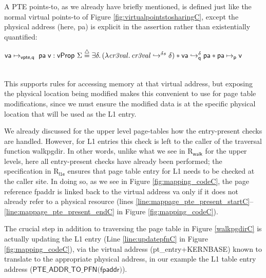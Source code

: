 A PTE points-to, as we already have briefly mentioned, is defined just like the normal virtual points-to of Figure \ref{fig:virtualpointstosharingC}, except the physical address (here, \textsf{pa}) is explicit in the assertion
rather than existentially quantified:\\
\centerline{$
    \vaddr\mapsto_{\textsf{vpte,q}} \; \paddr \; \vpage : \mathsf{vProp}~\Sigma \stackrel{\triangle}{=} 
    \exists \delta\ldotp
	(\lambda \mathit{cr3val}\ldotp
	\ghostmaptoken{\delta{}s}{\mathit{cr3val}}{\delta}) \ast 
  \fracghostmaptoken{\delta}{\vaddr}{\paddr}{\qfrac} \ast \paddr \mapsto_{\mathsf{p}} \vpage
$}\\
This supports rules for accessing memory
at that virtual address, but exposing the physical location being modified
makes this convenient to use for page table modifications, since we must ensure
the modified data is at the specific physical location that will be used as the L1 entry.



We already discussed for the upper level page-tables how the entry-present checks are handled.
However, for L1 entries this check is left to the caller of the
traversal function \textsf{walkpgdir}. In other words, unlike what we see in R$_{\textsf{walk}}$ for the upper levels, here all entry-present
checks have already been performed; the specification in R$_{\textsf{l1e}}$ ensures that page table entry for L1 needs to be checked at the caller site. 
In doing so, as we see in Figure \ref{fig:mapping_codeC}, the page reference \textsf{fpaddr} is linked back to the virtual address \textsf{va} 
only if it does not already refer to a physical resource (lines \ref{line:mappage_pte_present_startC}--\ref{line:mappage_pte_present_endC} in Figure \ref{fig:mapping_codeC}). 

The crucial step in addition to traversing the page table in Figure \ref{walkpgdirC} is actually updating the L1 entry (Line \ref{line:updatepfnC} in Figure \ref{fig:mapping_codeC}),
via the virtual address (\textsf{pt\_entry+KERNBASE}) known to translate to the appropriate physical address, in our example the L1
table entry address ($\textsf{PTE\_ADDR\_TO\_PFN(fpaddr)}$).

